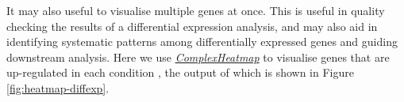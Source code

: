 \documentclass[9pt,a4paper,]{extarticle}
\newenvironment{Shaded}{\begin{snugshade}}{\end{snugshade}}
\newcommand{\CommentTok}[1]{\textcolor[rgb]{0.56,0.35,0.01}{\textit{#1}}}
\newcommand{\DataTypeTok}[1]{\textcolor[rgb]{0.13,0.29,0.53}{#1}}
\newcommand{\DecValTok}[1]{\textcolor[rgb]{0.00,0.00,0.81}{#1}}
\newcommand{\KeywordTok}[1]{\textcolor[rgb]{0.13,0.29,0.53}{\textbf{#1}}}
\newcommand{\NormalTok}[1]{#1}
\newcommand{\OperatorTok}[1]{\textcolor[rgb]{0.81,0.36,0.00}{\textbf{#1}}}
\newcommand{\StringTok}[1]{\textcolor[rgb]{0.31,0.60,0.02}{#1}}
\begin{document}
\begin{Shaded}
\end{Shaded}

It may also useful to visualise multiple genes at once.
This is useful in quality checking the results of a differential expression
analysis, and may also aid in identifying systematic patterns among
differentially expressed genes and guiding downstream analysis.
Here we use \emph{\href{https://bioconductor.org/packages/3.11/ComplexHeatmap}{ComplexHeatmap}} to visualise genes that are
up-regulated in each condition \citep{Gu2016}, the output of which is shown in
Figure \ref{fig:heatmap-diffexp}.
\end{document}
